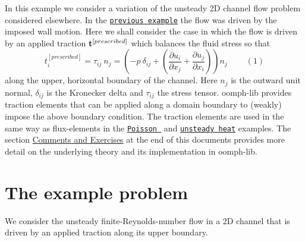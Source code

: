 In this example we consider a variation of the unsteady 2D channel flow problem considered elsewhere. In the \href{../../rayleigh_channel/html/index.html}{\tt previous example} the flow was driven by the imposed wall motion. Here we shall consider the case in which the flow is driven by an applied traction $ {\bf t}^{[prescribed]}$ which balances the fluid stress so that \[ t_i^{[prescribed]} = \tau_{ij} \ n_j = \left( -p\ \delta_{ij} + \left(\frac{\partial u_i}{\partial x_j} + \frac{\partial u_j}{\partial x_i}\right)\right) n_j \ \ \ \ \ \ \ \ \ \ (1) \] along the upper, horizontal boundary of the channel. Here $ n_j $ is the outward unit normal, $ \delta_{ij} $ is the Kronecker delta and $ \tau_{ij} $ the stress tensor. {\ttfamily oomph-\/lib} provides traction elements that can be applied along a domain boundary to (weakly) impose the above boundary condition. The traction elements are used in the same way as flux-\/elements in the \href{../../../poisson/two_d_poisson_flux_bc/html/index.html}{\tt Poisson } and \href{../../../unsteady_heat/two_d_unsteady_heat_adapt/html/index.html}{\tt unsteady heat} examples. The section \hyperlink{index_comments}{Comments and Exercises} at the end of this documents provides more detail on the underlying theory and its implementation in {\ttfamily oomph-\/lib}.



 

\hypertarget{index_example}{}\section{The example problem}\label{index_example}
We consider the unsteady finite-\/\+Reynolds-\/number flow in a 2D channel that is driven by an applied traction along its upper boundary.

